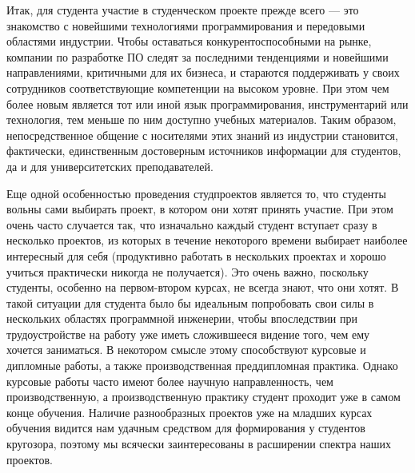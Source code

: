 \documentclass[a4paper]{article}
\begin{document}
Итак, для студента участие в студенческом проекте прежде всего --- это знакомство с новейшими технологиями программирования и передовыми областями индустрии. Чтобы оставаться конкурентоспособными на рынке, компании по разработке ПО следят за последними тенденциями и новейшими направлениями, критичными для их бизнеса, и стараются поддерживать у своих сотрудников соответствующие компетенции на высоком уровне. При этом чем более новым является тот или иной язык программирования, инструментарий или технология, тем меньше по ним доступно учебных материалов. Таким образом, непосредственное общение с носителями этих знаний из индустрии становится, фактически, единственным достоверным источников информации для студентов, да и для университетских преподавателей.  

Еще одной особенностью проведения студпроектов является то, что студенты вольны сами выбирать проект, в котором они хотят принять участие. При этом очень часто случается так, что изначально каждый студент вступает сразу в несколько проектов, из которых в течение некоторого времени выбирает наиболее интересный для себя (продуктивно работать в нескольких проектах и хорошо учиться практически никогда не получается). Это очень важно, поскольку студенты, особенно на первом-втором курсах, не всегда знают, что они хотят. В такой ситуации для студента было бы идеальным попробовать свои силы в нескольких областях программной инженерии, чтобы впоследствии при трудоустройстве на работу уже иметь сложившееся видение того, чем ему хочется заниматься. В некотором смысле этому способствуют курсовые и дипломные работы, а также производственная преддипломная практика. Однако курсовые работы часто имеют более научную направленность, чем производственную, а производственную практику студент проходит уже в самом конце обучения. Наличие разнообразных проектов уже на младших курсах обучения видится нам удачным средством для формирования у студентов кругозора, поэтому мы всячески заинтересованы в расширении спектра наших проектов. 
\end{document}
